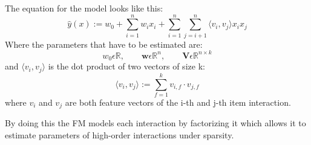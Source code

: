 The equation for the model looks like this:
\[ \hat{y}(x) := w_0 + \sum_{i=1}^{n} w_ix_i + \sum_{i=1}^{n}\sum_{j=i+1}^{n} \big \langle v_i,v_j \big \rangle x_ix_j \]
Where the parameters that have to be estimated are:
\[ w_0 \epsilon \mathbb{R}, \qquad \mathbf{w} \epsilon \mathbb{R}^n, \qquad  \mathbf{V}\epsilon \mathbb{R}^{n \times k} \]
and $\big \langle v_i,v_j \big \rangle$ is the dot product of two vectors of size k:
\[ \big \langle v_i,v_j \big \rangle := \sum_{f=1}^{k} v_{i,f} \cdot v_{j,f}\]
where $v_i$ and $v_j$ are both feature vectors of the i-th and j-th item interaction.

By doing this the FM models each interaction by factorizing it which allows it to estimate parameters of high-order interactions under sparsity.
